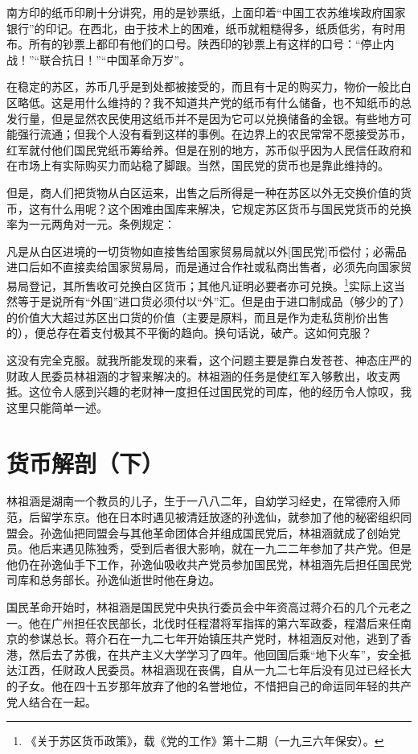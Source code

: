 \documentclass[10pt]{book}
\begin{document}
南方印的纸币印刷十分讲究，用的是钞票纸，上面印着“中国工农苏维埃政府国家银行”的印记。在西北，由于技术上的困难，纸币就粗糙得多，纸质低劣，有时用布。所有的钞票上都印有他们的口号。陕西印的钞票上有这样的口号：“停止内战！”“联合抗日！”“中国革命万岁”。

在稳定的苏区，苏币几乎是到处都被接受的，而且有十足的购买力，物价一般比白区略低。这是用什么维持的？我不知道共产党的纸币有什么储备，也不知纸币的总发行量，但是显然农民使用这纸币并不是因为它可以兑换储备的金银。有些地方可能强行流通；但我个人没有看到这样的事例。在边界上的农民常常不愿接受苏币，红军就付他们国民党纸币筹给养。但是在别的地方，苏币似乎因为人民信任政府和在市场上有实际购买力而站稳了脚跟。当然，国民党的货币也是靠此维持的。

但是，商人们把货物从白区运来，出售之后所得是一种在苏区以外无交换价值的货币，这有什么用呢？这个困难由国库来解决，它规定苏区货币与国民党货币的兑换率为一元两角对一元。条例规定：

凡是从白区进境的一切货物如直接售给国家贸易局就以外[国民党]币偿付；必需品进口后如不直接卖给国家贸易局，而是通过合作社或私商出售者，必须先向国家贸易局登记，其所售收可兑换白区货币；其他凡证明必要者亦可兑换。\footnote{《关于苏区货币政策》，载《党的工作》第十二期（一九三六年保安）。}实际上这当然等于是说所有“外国”进口货必须付以“外”汇。但是由于进口制成品（够少的了）的价值大大超过苏区出口货的价值（主要是原料，而且是作为走私货削价出售的），便总存在着支付极其不平衡的趋向。换句话说，破产。这如何克服？

这没有完全克服。就我所能发现的来看，这个问题主要是靠白发苍苍、神态庄严的财政人民委员林祖涵的才智来解决的。林祖涵的任务是使红军入够敷出，收支两抵。这位令人感到兴趣的老财神一度担任过国民党的司库，他的经历令人惊叹，我这里只能简单一述。



\section{货币解剖（下）}

林祖涵是湖南一个教员的儿子，生于一八八二年，自幼学习经史，在常德府入师范，后留学东京。他在日本时遇见被清廷放逐的孙逸仙，就参加了他的秘密组织同盟会。孙逸仙把同盟会与其他革命团体合并组成国民党后，林祖涵就成了创始党员。他后来遇见陈独秀，受到后者很大影响，就在一九二二年参加了共产党。但是他仍在孙逸仙手下工作，孙逸仙吸收共产党员参加国民党，林祖涵先后担任国民党司库和总务部长。孙逸仙逝世时他在身边。

国民革命开始时，林祖涵是国民党中央执行委员会中年资高过蒋介石的几个元老之一。他在广州担任农民部长，北伐时任程潜将军指挥的第六军政委，程潜后来任南京的参谋总长。蒋介石在一九二七年开始镇压共产党时，林祖涵反对他，逃到了香港，然后去了苏俄，在共产主义大学学习了四年。他回国后乘“地下火车”，安全抵达江西，任财政人民委员。林祖涵现在丧偶，自从一九二七年后没有见过已经长大的子女。他在四十五岁那年放弃了他的名誉地位，不惜把自己的命运同年轻的共产党人结合在一起。
\end{document}

